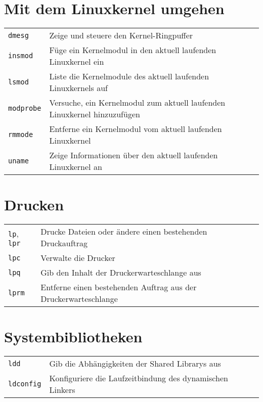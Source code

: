 \documentclass[10pt,a4paper]{article}
\begin{document}
\begin{multicols}{2}
\section{Mit dem Linuxkernel umgehen}
\begin{tabular}{ p{2.5cm} p{8.5cm} }
  \hline
  \texttt{dmesg} & Zeige und steuere den Kernel-Ringpuffer\\
  \rowcolor{Gray}
  \texttt{insmod} & Füge ein Kernelmodul in den aktuell laufenden Linux\-kernel ein\\
  \texttt{lsmod} & Liste die Kernelmodule des aktuell laufenden Linux\-kernels auf\\
  \rowcolor{Gray}
  \texttt{modprobe} & Versuche, ein Kernelmodul zum aktuell laufenden Linux\-kernel hinzuzufügen \\
  \texttt{rmmode} & Entferne ein Kernelmodul vom aktuell laufenden Linux\-kernel \\
  \rowcolor{Gray}
  \texttt{uname} & Zeige Informationen über den aktuell laufenden \newline Linuxkernel an\\
  \hline
\end{tabular}

\section{Drucken}
\begin{tabular}{ p{2.5cm} p{8.5cm} }
  \hline
  \texttt{lp}, \texttt{lpr} & Drucke Dateien oder ändere einen bestehenden Druckauftrag\\
  \rowcolor{Gray}
  \texttt{lpc} & Verwalte die Drucker \\
  \texttt{lpq} & Gib den Inhalt der Druckerwarteschlange aus\\
  \rowcolor{Gray}
  \texttt{lprm} & Entferne einen bestehenden Auftrag aus der Druckerwarteschlange \\
  \hline
\end{tabular}

\section{Systembibliotheken}

\begin{tabular}{ p{2.5cm} p{8.5cm} }
  \hline 
  \texttt{ldd} & Gib die Abhängigkeiten der Shared Librarys aus \\
  \rowcolor{Gray}
  \texttt{ldconfig} & Konfiguriere die Laufzeitbindung des dynamischen Linkers \\
  \hline
\end{tabular}


\end{multicols}
\end{document}
